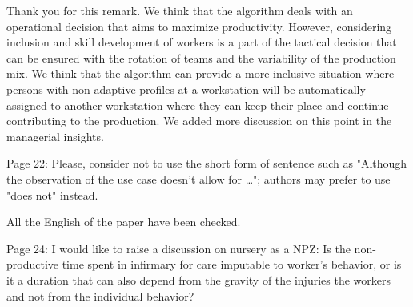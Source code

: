\documentclass[preprint,11pt,3p]{elsarticle}
\begin{document}
\begin{tcolorbox}[colback=r_color1,colframe=r_color2,title=R10:]
Thank you for this remark. We think that the algorithm deals with an operational decision that aims to maximize productivity. However, considering inclusion and skill development of workers is a part of the tactical decision that can be ensured with the rotation of teams and the variability of the production mix. We think that the algorithm can provide a more inclusive situation where persons with non-adaptive profiles at a workstation will be automatically assigned to another workstation where they can keep their place and continue contributing to the production. We added more discussion on this point in the managerial insights. %
\end{tcolorbox}

\begin{tcolorbox}[colback=q_color1,colframe=q_color2,title=Q11  :] Page 22: Please, consider not to use the short form of sentence such as "Although the observation of the use case doesn't allow for …"; authors may prefer to use "does not" instead.
\end{tcolorbox}

\begin{tcolorbox}[colback=r_color1,colframe=r_color2,title=R11:]
All the English of the paper have been checked. 
\end{tcolorbox}
\begin{tcolorbox}[colback=q_color1,colframe=q_color2,title=Q12  :] Page 24: I would like to raise a discussion on nursery as a NPZ: Is the non-productive time spent in infirmary for care imputable to worker's behavior, or is it a duration that can also depend from the gravity of the injuries the workers and not from the individual behavior?
\end{tcolorbox}
\end{document}
